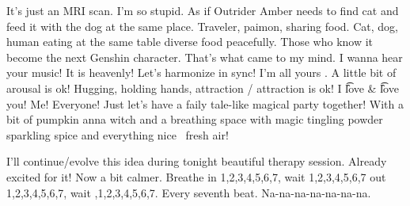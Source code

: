 It's just an MRI scan. I'm so stupid. As if Outrider Amber needs to find cat and feed it with the dog at the same place. Traveler, paimon, sharing food. Cat, dog, human eating at the same table diverse food peacefully. Those who know it become the next Genshin character. That's what came to my mind. I wanna hear your music! It is heavenly! Let's harmonize in sync! I'm all yours . A little bit of arousal is ok! Hugging, holding hands, attraction  / attraction  is ok! I \f{\t{love}} \& \t{\f{love}} you! Me! Everyone! Just let's have a faily tale-like magical party together! With a bit of pumpkin anna witch and a breathing space with magic tingling powder sparkling spice and everything nice \emdash\ fresh air!

I'll continue/evolve this idea during tonight beautiful therapy session. Already excited for it! Now a bit calmer. Breathe in 1,2,3,4,5,6,7, wait 1,2,3,4,5,6,7 out 1,2,3,4,5,6,7, wait ,1,2,3,4,5,6,7. Every seventh beat. Na-na-na-na-na-na-na.

